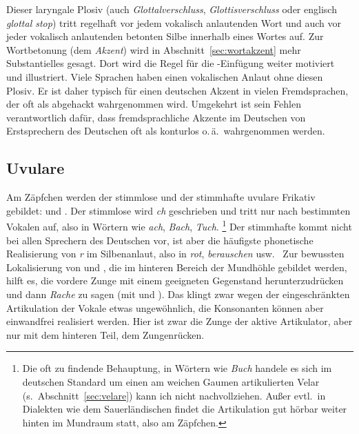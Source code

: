 \begin{exe}
  \ex\label{ex:phot2529}
  \begin{xlist}
  \end{xlist}
\end{exe}

Dieser laryngale Plosiv (auch \textit{Glottalverschluss}, \textit{Glottisverschluss} oder englisch \textit{glottal stop}) tritt regelhaft vor jedem vokalisch anlautenden Wort und auch vor jeder vokalisch anlautenden betonten Silbe innerhalb eines Wortes auf.
Zur Wortbetonung (dem \textit{Akzent}) wird in Abschnitt~\ref{sec:wortakzent} mehr Substantielles gesagt.
Dort wird die Regel für die \textipa{[P]}-Einfügung weiter motiviert und illustriert.
Viele Sprachen haben einen vokalischen Anlaut ohne diesen Plosiv.
Er ist daher typisch für einen deutschen Akzent in vielen Fremdsprachen, der oft als abgehackt wahrgenommen wird.
Umgekehrt ist sein Fehlen verantwortlich dafür, dass fremdsprachliche Akzente im Deutschen von Erstsprechern des Deutschen oft als konturlos o.\,ä.\ wahrgenommen werden.

\subsection{Uvulare}

\label{sec:uvulare}


Am Zäpfchen werden der stimmlose und der stimmhafte uvulare Frikativ gebildet: \textipa{[X]} und \textipa{[K]}.
Der stimmlose wird \textit{ch} geschrieben und tritt nur nach bestimmten Vokalen auf, also in Wörtern wie \textit{ach}, \textit{Bach}, \textit{Tuch}.%
\footnote{Die oft zu findende Behauptung, in Wörtern wie \textit{Buch} handele es sich im deutschen Standard um einen am weichen Gaumen artikulierten Velar \textipa{[x]} (s.\ Abschnitt~\ref{sec:velare}) kann ich nicht nachvollziehen.
Außer evtl.\ in Dialekten wie dem Sauerländischen findet die Artikulation gut hörbar weiter hinten im Mundraum statt, also am Zäpfchen.
}
Der stimmhafte kommt nicht bei allen Sprechern des Deutschen vor, ist aber die häufigste phonetische Realisierung von \textit{r} im Silbenanlaut, also in \textit{rot}, \textit{berauschen} usw.
\TuBegin~Zur bewussten Lokalisierung von \textipa{[X]} und \textipa{[K]}, die im hinteren Bereich der Mundhöhle gebildet werden, hilft es, die vordere Zunge mit einem geeigneten Gegenstand herunterzudrücken und dann \zB \textit{Rache} zu sagen (mit \textipa{[K]} und \textipa{[X]}).
Das klingt zwar wegen der eingeschränkten Artikulation der Vokale etwas ungewöhnlich, die Konsonanten können aber einwandfrei realisiert werden.
Hier ist zwar die Zunge der aktive Artikulator, aber nur mit dem hinteren Teil, dem Zungenrücken.

